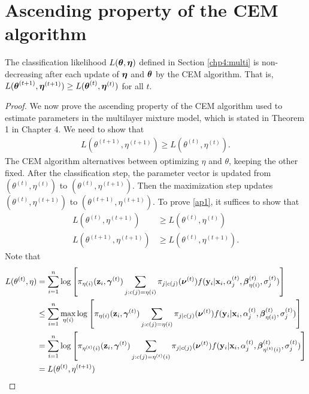 \chapter{Ascending property of the CEM algorithm}\label{append:2}
\begin{theorem} The classification likelihood $L(\boldsymbol\theta,\boldsymbol\eta)$ defined in Section \ref{chp4:multi} is non-decreasing after each update of $\boldsymbol\eta$ and $\boldsymbol\theta$ by the CEM algorithm. That is, $L(\boldsymbol\theta^{(t+1)},\boldsymbol\eta^{(t+1)}) \geq L(\boldsymbol\theta^{(t)},\boldsymbol\eta^{(t)})$ for all $t$.
\end{theorem}
\begin{proof}
We now prove the ascending property of the CEM algorithm used to estimate parameters in the multilayer mixture model, which is stated in Theorem 1 in Chapter 4. We need to show that
    \begin{align}\label{ap1}L(\theta^{(t+1)},\eta^{(t+1)})\geq L(\theta^{(t)},\eta^{(t)}).\end{align}
    The CEM algorithm alternatives between optimizing $\eta$ and $\theta$, keeping the other fixed. After the classification step, the parameter vector is updated from $(\theta^{(t)},\eta^{(t)})$ to $(\theta^{(t)},\eta^{(t+1)})$. Then the maximization step updates $(\theta^{(t)},\eta^{(t+1)})$ to $(\theta^{(t+1)},\eta^{(t+1)})$. To prove \ref{ap1}, it suffices to show that
    \begin{align*}
    L(\theta^{(t)},\eta^{(t+1)})&\geq L(\theta^{(t)},\eta^{(t)})\\
    L(\theta^{(t+1)},\eta^{(t+1)})&\geq L(\theta^{(t)},\eta^{(t+1)}).
    \end{align*}
    Note that 
    \begin{align*}
 L(\theta^{(t)},\eta)&=\sum^{n}_{i=1}\log\left[\pi_{\eta(i)}(\mathbf z_{i},\boldsymbol \gamma^{(t)})\sum_{j:c(j)=\eta(i)}\pi_{j|c(j)}(\boldsymbol\nu^{(t)})f(\mathbf y_{i}|\mathbf x_{i},\alpha_{j}^{(t)},\boldsymbol\beta^{(t)}_{\eta(i)},\sigma^{(t)}_{j})\right]\\
 &\leq \sum^{n}_{i=1}\max_{\eta(i)}\log\left[\pi_{\eta(i)}(\mathbf z_{i},\boldsymbol \gamma^{(t)})\sum_{j:c(j)=\eta(i)}\pi_{j|c(j)}(\boldsymbol\nu^{(t)})f(\mathbf y_{i}|\mathbf x_{i},\alpha_{j}^{(t)},\boldsymbol\beta^{(t)}_{\eta(i)},\sigma^{(t)}_{j})\right]\\
  &= \sum^{n}_{i=1}\log\left[\pi_{\eta^{(t)}(i)}(\mathbf z_{i},\boldsymbol \gamma^{(t)})\sum_{j:c(j)=\eta^{(t)}(i)}\pi_{j|c(j)}(\boldsymbol\nu^{(t)})f(\mathbf y_{i}|\mathbf x_{i},\alpha_{j}^{(t)},\boldsymbol\beta^{(t)}_{\eta^{(t)}(i)},\sigma^{(t)}_{j})\right]\\
  &= L(\theta^{(t)},\eta^{(t+1)})
    \end{align*}

\end{proof}
